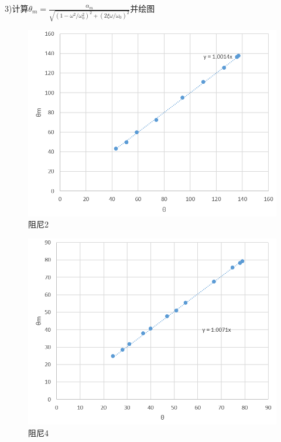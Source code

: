 \documentclass[UTF8]{ctexart}
\begin{document}
        3)计算$\theta_{m}=\frac{\alpha_{m}}{\sqrt{(1-\omega^{2}/\omega_{0}^{2})^{2}+(2\xi\omega/\omega_{0})^{2}}}$并绘图
        \begin{figure}[!htbp]
            \centering
            \includegraphics[scale=0.85]{fifth.png}
            \caption{阻尼2}
        \end{figure}
        \begin{figure}[!htbp]
            \centering
            \includegraphics[scale=0.85]{fouth.png}
            \caption{阻尼4}
        \end{figure}
\end{document}
